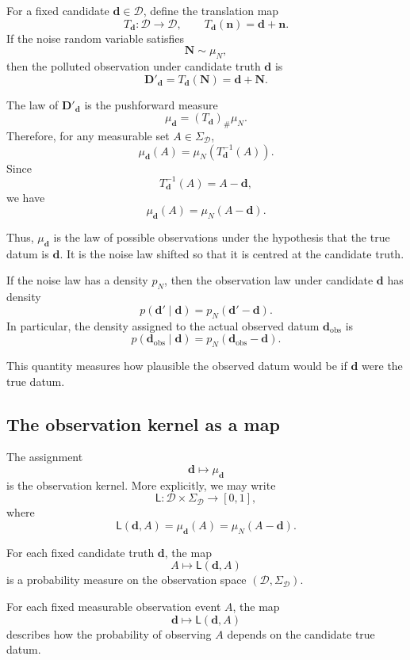 \documentclass[11pt]{article}
\newcommand{\Dspace}{\mathcal D}
\newcommand{\SigmaD}{\Sigma_{\mathcal D}}
\newcommand{\muN}{\mu_N}
\newcommand{\Dobsrand}{\mathbf D'}
\newcommand{\Nrand}{\mathbf N}
\newcommand{\dobs}{\mathbf d_{\mathrm{obs}}}
\begin{document}
For a fixed candidate \(\mathbf d\in\Dspace\), define the translation map
\[
    T_{\mathbf d}:\Dspace\to\Dspace,
    \qquad
    T_{\mathbf d}(\mathbf n)=\mathbf d+\mathbf n.
\]
If the noise random variable satisfies
\[
    \Nrand\sim\muN,
\]
then the polluted observation under candidate truth \(\mathbf d\) is
\[
    \Dobsrand_{\mathbf d}
    =
    T_{\mathbf d}(\Nrand)
    =
    \mathbf d+\Nrand.
\]

The law of \(\Dobsrand_{\mathbf d}\) is the pushforward measure
\[
    \mu_{\mathbf d}
    =
    (T_{\mathbf d})_{\#}\muN.
\]
Therefore, for any measurable set \(A\in\SigmaD\),
\[
    \mu_{\mathbf d}(A)
    =
    \muN\!\left(T_{\mathbf d}^{-1}(A)\right).
\]
Since
\[
    T_{\mathbf d}^{-1}(A)
    =
    A-\mathbf d,
\]
we have
\[
    \mu_{\mathbf d}(A)
    =
    \muN(A-\mathbf d).
\]

Thus, \(\mu_{\mathbf d}\) is the law of possible observations under the hypothesis that the true datum is \(\mathbf d\). It is the noise law shifted so that it is centred at the candidate truth.

If the noise law has a density \(p_N\), then the observation law under candidate \(\mathbf d\) has density
\[
    p(\mathbf d'\mid \mathbf d)
    =
    p_N(\mathbf d'-\mathbf d).
\]
In particular, the density assigned to the actual observed datum \(\dobs\) is
\[
    p(\dobs\mid \mathbf d)
    =
    p_N(\dobs-\mathbf d).
\]

This quantity measures how plausible the observed datum would be if \(\mathbf d\) were the true datum.

\subsection{The observation kernel as a map}

The assignment
\[
    \mathbf d
    \longmapsto
    \mu_{\mathbf d}
\]
is the observation kernel. More explicitly, we may write
\[
    \mathsf L:\Dspace\times\SigmaD\to[0,1],
\]
where
\[
    \mathsf L(\mathbf d,A)
    =
    \mu_{\mathbf d}(A)
    =
    \muN(A-\mathbf d).
\]

For each fixed candidate truth \(\mathbf d\), the map
\[
    A\longmapsto \mathsf L(\mathbf d,A)
\]
is a probability measure on the observation space \((\Dspace,\SigmaD)\).

For each fixed measurable observation event \(A\), the map
\[
    \mathbf d\longmapsto \mathsf L(\mathbf d,A)
\]
describes how the probability of observing \(A\) depends on the candidate true datum.
\end{document}
